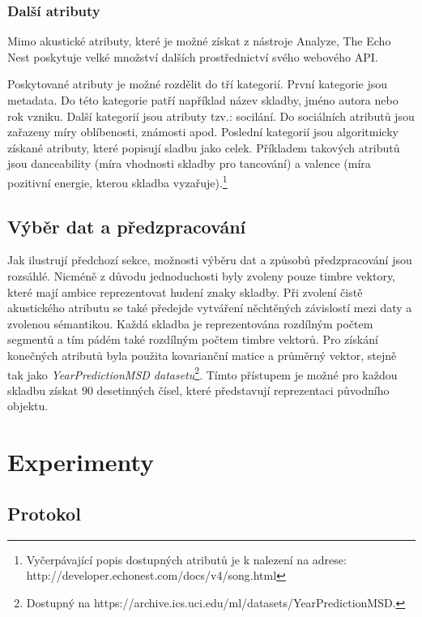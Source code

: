 \documentclass[thesis=M,czech]{FITthesis}[2012/06/26]
\begin{document}
\subsection{Další atributy}
Mimo akustické atributy, které je možné získat z nástroje Analyze, The Echo Nest poskytuje velké množství dalších prostřednictví svého webového API.

Poskytované atributy je možné rozdělit do tří kategorií. První kategorie jsou metadata. Do této kategorie patří například název skladby, jméno autora nebo rok vzniku. Další kategorií jsou atributy tzv.: socilání. Do sociálních atributů jsou zařazeny míry oblíbenosti, známosti apod. Poslední kategorií jsou algoritmicky získané atributy, které popisují sladbu jako celek. Příkladem takových atributů jsou danceability (míra vhodnosti skladby pro tancování) a valence (míra pozitivní energie, kterou skladba vyzařuje).\footnote{Vyčerpávající popis dostupných atributů je k nalezení na adrese: http://developer.echonest.com/docs/v4/song.html}

\section{Výběr dat a předzpracování}
Jak ilustrují předchozí sekce, možnosti výběru dat a způsobů předzpracování jsou rozsáhlé. Nicméně z důvodu jednoduchosti byly zvoleny pouze timbre vektory, které mají ambice reprezentovat hudení znaky skladby. Při zvolení čistě akustického atributu se také předejde vytváření něchtěných závislostí mezi daty a zvolenou sémantikou. Každá skladba je reprezentována rozdílným počtem segmentů a tím pádém také rozdílným počtem timbre vektorů. Pro získání konečných atributů byla použita kovarianční matice a průměrný vektor, stejně tak jako \textit{YearPredictionMSD datasetu}\footnote{Dostupný na https://archive.ics.uci.edu/ml/datasets/YearPredictionMSD.}. Tímto přístupem je možné pro každou skladbu získat $90$ desetinných čísel, které představují reprezentaci původního objektu. 




\chapter{Experimenty}
\section{Protokol}
\end{document}
